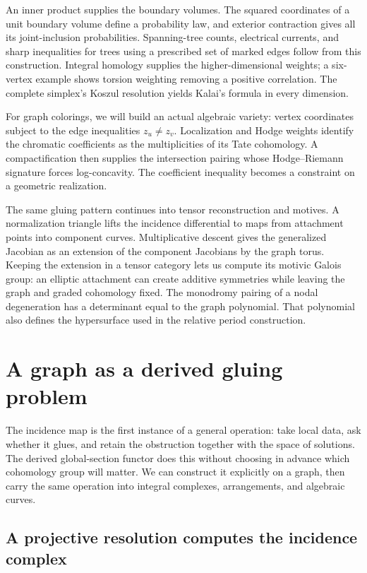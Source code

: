 \documentclass[11pt]{article}
\theoremstyle{definition}
\theoremstyle{remark}
\begin{document}
An inner product supplies the boundary volumes. The squared coordinates of a unit boundary volume define a probability law, and exterior contraction gives all its joint-inclusion probabilities. Spanning-tree counts, electrical currents, and sharp inequalities for trees using a prescribed set of marked edges follow from this construction. Integral homology supplies the higher-dimensional weights; a six-vertex example shows torsion weighting removing a positive correlation. The complete simplex's Koszul resolution yields Kalai's formula in every dimension.

For graph colorings, we will build an actual algebraic variety: vertex coordinates subject to the edge inequalities $z_u\ne z_v$. Localization and Hodge weights identify the chromatic coefficients as the multiplicities of its Tate cohomology. A compactification then supplies the intersection pairing whose Hodge--Riemann signature forces log-concavity. The coefficient inequality becomes a constraint on a geometric realization.

The same gluing pattern continues into tensor reconstruction and motives. A normalization triangle lifts the incidence differential to maps from attachment points into component curves. Multiplicative descent gives the generalized Jacobian as an extension of the component Jacobians by the graph torus. Keeping the extension in a tensor category lets us compute its motivic Galois group: an elliptic attachment can create additive symmetries while leaving the graph and graded cohomology fixed. The monodromy pairing of a nodal degeneration has a determinant equal to the graph polynomial. That polynomial also defines the hypersurface used in the relative period construction.


\section{A graph as a derived gluing problem}
\label{sec:derived-gluing}

The incidence map is the first instance of a general operation: take local data, ask whether it glues, and retain the obstruction together with the space of solutions. The derived global-section functor does this without choosing in advance which cohomology group will matter. We can construct it explicitly on a graph, then carry the same operation into integral complexes, arrangements, and algebraic curves.

\subsection{A projective resolution computes the incidence complex}
\end{document}
